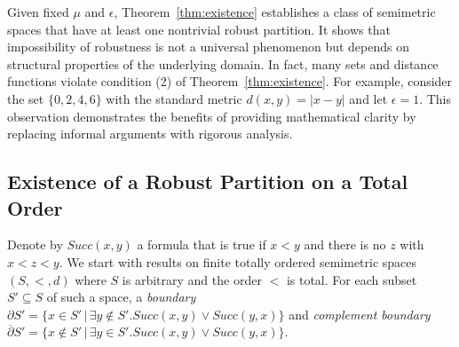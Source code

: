 Given fixed $\mu$ and $\epsilon$, Theorem~\ref{thm:existence} establishes a class of semimetric spaces that have at least one nontrivial robust partition. It shows that impossibility of robustness is not a universal phenomenon but depends on structural properties of the underlying domain. In fact, many sets and distance functions violate condition (2) of Theorem~\ref{thm:existence}. For example, consider the set $\{0,2,4,6\}$ with the standard metric $d(x,y) = |x - y|$ and let $\epsilon = 1$. This observation demonstrates the benefits of providing mathematical clarity by replacing informal arguments with rigorous analysis.

\subsection{Existence of a Robust Partition on a Total Order}
\label{subsec:existence-order}

Denote by $Succ(x,y)$ a formula that is true if $x < y$ and there is no $z$ with $x < z < y$. We start with results on finite totally ordered semimetric spaces $(S, <, d)$ where $S$ is arbitrary and the order $<$ is total. For each subset $S' \subseteq S$ of such a space, a \emph{boundary} $\partial S' = \{x \in S' \,|\, \exists y \not\in S' . Succ(x,y) \vee Succ(y,x)\}$ and \emph{complement boundary} $\overline\partial S' = \{x \not\in S' \,|\, \exists y \in S' . Succ(x,y) \vee Succ(y,x)\}$.

